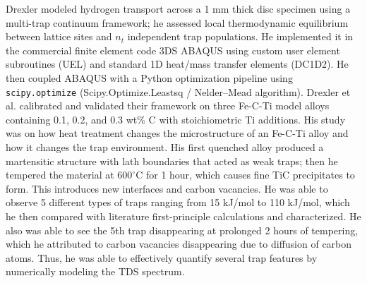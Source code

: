 \documentclass[a4paper,12pt,oneside]{report}
\begin{document}
Drexler \cite{Drexler2019} modeled hydrogen transport across a 1 mm thick disc specimen using a multi-trap continuum framework; he assessed local thermodynamic equilibrium between lattice sites and $n_t$ independent trap populations. He implemented it in the commercial finite element code 3DS ABAQUS using custom user element subroutines (UEL) and standard 1D heat/mass transfer elements (DC1D2). He then coupled ABAQUS with a Python optimization pipeline using \texttt{scipy.optimize} (Scipy.Optimize.Leastsq / Nelder–Mead algorithm). Drexler et al. \cite{Drexler2019} calibrated and validated their framework on three Fe-C-Ti model alloys containing 0.1, 0.2, and 0.3 wt\% C with stoichiometric Ti additions. His study was on how heat treatment changes the microstructure of an Fe-C-Ti alloy and how it changes the trap environment. His first quenched alloy produced a martensitic structure with lath boundaries that acted as weak traps; then he tempered the material at $600^\circ\text{C}$ for 1 hour, which causes fine TiC precipitates to form. This introduces new interfaces and carbon vacancies. He was able to observe 5 different types of traps ranging from 15 kJ/mol to 110 kJ/mol, which he then compared with literature first-principle calculations and characterized. He also was able to see the 5th trap disappearing at prolonged 2 hours of tempering, which he attributed to carbon vacancies disappearing due to diffusion of carbon atoms. Thus, he was able to effectively quantify several trap features by numerically modeling the TDS spectrum.
\end{document}
